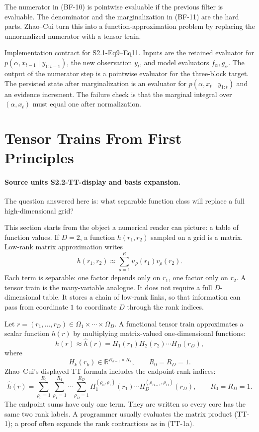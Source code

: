 \documentclass[11pt]{article}
\newcommand{\R}{\mathbb R}
\begin{document}
The numerator in (BF-10) is pointwise evaluable if the previous filter is
evaluable.  The denominator and the marginalization in (BF-11) are the hard
parts.  Zhao--Cui turn this into a function-approximation problem by replacing
the unnormalized numerator with a tensor train.

Implementation contract for S2.1-Eq9--Eq11.  Inputs are the retained evaluator
for \(p(\alpha,x_{t-1}\mid y_{1:t-1})\), the new observation \(y_t\), and model
evaluators \(f_\alpha,g_\alpha\).  The output of the numerator step is a
pointwise evaluator for the three-block target.  The persisted state after
marginalization is an evaluator for \(p(\alpha,x_t\mid y_{1:t})\) and an
evidence increment.  The failure check is that the marginal integral over
\((\alpha,x_t)\) must equal one after normalization.

\section{Tensor Trains From First Principles}

\paragraph{Source units S2.2-TT-display and basis expansion.}
The question answered here is: what separable function class will replace a
full high-dimensional grid?

This section starts from the object a numerical reader can picture: a table of
function values.  If \(D=2\), a function \(h(r_1,r_2)\) sampled on a grid is a
matrix.  Low-rank matrix approximation writes
\[
    h(r_1,r_2)\approx \sum_{\rho=1}^{R} u_\rho(r_1)v_\rho(r_2).
\]
Each term is separable: one factor depends only on \(r_1\), one factor only on
\(r_2\).  A tensor train is the many-variable analogue.  It does not require a
full \(D\)-dimensional table.  It stores a chain of low-rank links, so that
information can pass from coordinate \(1\) to coordinate \(D\) through the rank
indices.

Let \(r=(r_1,\ldots,r_D)\in\Omega_1\times\cdots\times\Omega_D\).  A functional
tensor train approximates a scalar function \(h(r)\) by multiplying
matrix-valued one-dimensional functions:
\[
    h(r)
    \approx
    \widehat h(r)
    =
    H_1(r_1)H_2(r_2)\cdots H_D(r_D),
    \tag{TT-1}
\]
where
\[
    H_k(r_k)\in \R^{R_{k-1}\times R_k},\qquad R_0=R_D=1.
\]
Zhao--Cui's displayed TT formula includes the endpoint rank indices:
\[
    \widehat h(r)
    =
    \sum_{\rho_0=1}^{R_0}\sum_{\rho_1=1}^{R_1}\cdots
    \sum_{\rho_D=1}^{R_D}
    H_1^{(\rho_0,\rho_1)}(r_1)\cdots
    H_D^{(\rho_{D-1},\rho_D)}(r_D),
    \qquad R_0=R_D=1.
    \tag{TT-1a}
\]
The endpoint sums have only one term.  They are written so every core has the
same two rank labels.  A programmer usually evaluates the matrix product
(TT-1); a proof often expands the rank contractions as in (TT-1a).
\end{document}
